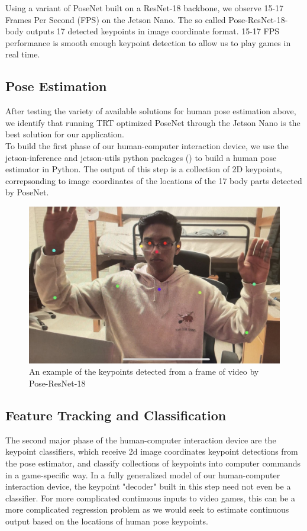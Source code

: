 \documentclass[10pt,twocolumn,letterpaper]{article}
\begin{document}
Using a variant of PoseNet built on a ResNet-18 backbone, we observe 15-17 Frames Per Second 
(FPS) on the Jetson Nano. The so called Pose-ResNet-18-body outputs 17 detected keypoints in 
image coordinate format. 15-17 FPS performance is smooth enough keypoint detection to allow us to 
play games in real time.

\subsection{Pose Estimation}
After testing the variety of available solutions for human pose estimation 
above, we identify that running TRT optimized PoseNet through the Jetson Nano 
is the best solution for our application.\\

To build the first phase of our human-computer interaction device, we use the 
jetson-inference and jetson-utils python packages (\cite{jetsonInference}) 
to build a human pose estimator in Python. The output of this step is a 
collection of 2D keypoints, correpsonding to image coordinates of the locations 
of the 17 body parts detected by PoseNet.\\

\begin{figure}[h]
    \centering
    \includegraphics[width = .8\linewidth]{images/pose_estimations.jpg}
    \caption{An example of the keypoints detected from a frame of video
    by Pose-ResNet-18}
\end{figure}

\subsection{Feature Tracking and Classification}
The second major phase of the human-computer interaction device are the 
keypoint classifiers, which receive 2d image coordinates keypoint detections 
from the pose estimator, and classify collections of keypoints into computer 
commands in a game-specific way. In a fully generalized model of our 
human-computer interaction device, the keypoint "decoder" built in this step 
need not even be a classifier. For more complicated continuous inputs to 
video games, this can be a more complicated regression problem as we would 
seek to estimate continuous output based on the locations of human pose 
keypoints.\\
\end{document}
